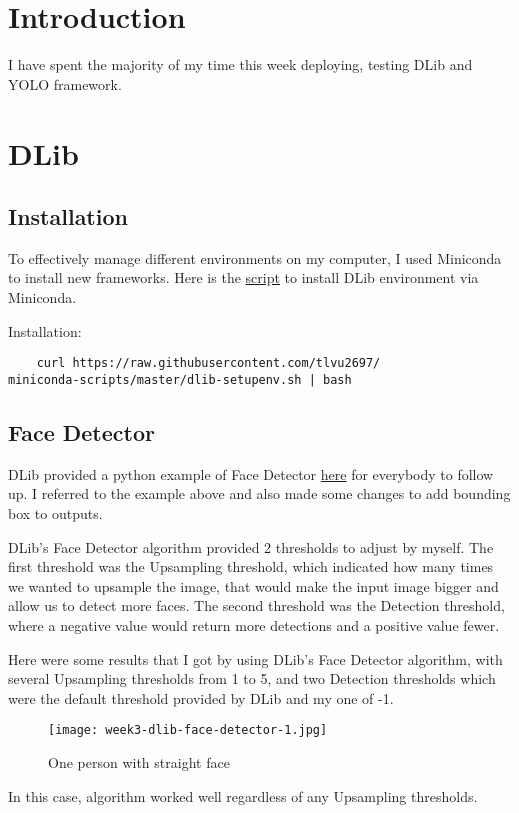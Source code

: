 \section{Introduction}
I have spent the majority of my time this week deploying, testing DLib\cite{dlib} and YOLO framework.

\section{DLib}
\subsection{Installation}
To effectively manage different environments on my computer, I used Miniconda to install new frameworks. Here is the \href{https://raw.githubusercontent.com/tlvu2697/miniconda-scripts/master/dlib-setupenv.sh}{script} to install DLib environment via Miniconda.

Installation:
	\begin{lstlisting}
    curl https://raw.githubusercontent.com/tlvu2697/
miniconda-scripts/master/dlib-setupenv.sh | bash
	\end{lstlisting}

\subsection{Face Detector}
DLib provided a python example of Face Detector \href{http://dlib.net/face_detector.py.html}{here} for everybody to follow up. I referred to the example above and also made some changes to add bounding box to outputs.

DLib's Face Detector algorithm provided 2 thresholds to adjust by myself. The first threshold was the Upsampling threshold, which indicated how many times we wanted to upsample the image, that would make the input image bigger and allow us to detect more faces. The second threshold was the Detection threshold, where a negative value would return more detections and a positive value fewer.

Here were some results that I got by using DLib's Face Detector algorithm, with several Upsampling thresholds from 1 to 5, and two Detection thresholds which were the default threshold provided by DLib and my one of -1.

\newpage
\begin{SCfigure}[0.5][!ht]
\caption{One person with straight face}
\texttt{[image: week3-dlib-face-detector-1.jpg]}
\end{SCfigure}
In this case, algorithm worked well regardless of any Upsampling thresholds.

